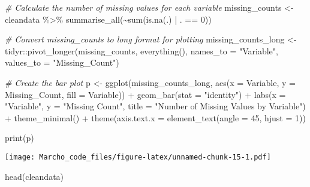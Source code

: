 \documentclass[
]{article}
\newenvironment{Shaded}{\begin{snugshade}}{\end{snugshade}}
\newcommand{\AttributeTok}[1]{\textcolor[rgb]{0.77,0.63,0.00}{#1}}
\newcommand{\CommentTok}[1]{\textcolor[rgb]{0.56,0.35,0.01}{\textit{#1}}}
\newcommand{\DecValTok}[1]{\textcolor[rgb]{0.00,0.00,0.81}{#1}}
\newcommand{\FunctionTok}[1]{\textcolor[rgb]{0.00,0.00,0.00}{#1}}
\newcommand{\NormalTok}[1]{#1}
\newcommand{\OtherTok}[1]{\textcolor[rgb]{0.56,0.35,0.01}{#1}}
\newcommand{\SpecialCharTok}[1]{\textcolor[rgb]{0.00,0.00,0.00}{#1}}
\newcommand{\StringTok}[1]{\textcolor[rgb]{0.31,0.60,0.02}{#1}}
\begin{document}
\begin{Shaded}
\begin{Highlighting}[]
\CommentTok{\# Calculate the number of missing values for each variable}
\NormalTok{missing\_counts }\OtherTok{\textless{}{-}}\NormalTok{ cleandata }\SpecialCharTok{\%\textgreater{}\%}
  \FunctionTok{summarise\_all}\NormalTok{(}\SpecialCharTok{\textasciitilde{}}\FunctionTok{sum}\NormalTok{(}\FunctionTok{is.na}\NormalTok{(.) }\SpecialCharTok{|}\NormalTok{ . }\SpecialCharTok{==} \DecValTok{0}\NormalTok{))}

\CommentTok{\# Convert missing\_counts to long format for plotting}
\NormalTok{missing\_counts\_long }\OtherTok{\textless{}{-}}\NormalTok{ tidyr}\SpecialCharTok{::}\FunctionTok{pivot\_longer}\NormalTok{(missing\_counts, }\FunctionTok{everything}\NormalTok{(), }\AttributeTok{names\_to =} \StringTok{"Variable"}\NormalTok{, }\AttributeTok{values\_to =} \StringTok{"Missing\_Count"}\NormalTok{)}

\CommentTok{\# Create the bar plot}
\NormalTok{p }\OtherTok{\textless{}{-}} \FunctionTok{ggplot}\NormalTok{(missing\_counts\_long, }\FunctionTok{aes}\NormalTok{(}\AttributeTok{x =}\NormalTok{ Variable, }\AttributeTok{y =}\NormalTok{ Missing\_Count, }\AttributeTok{fill =}\NormalTok{ Variable)) }\SpecialCharTok{+}
  \FunctionTok{geom\_bar}\NormalTok{(}\AttributeTok{stat =} \StringTok{"identity"}\NormalTok{) }\SpecialCharTok{+}
  \FunctionTok{labs}\NormalTok{(}\AttributeTok{x =} \StringTok{"Variable"}\NormalTok{, }\AttributeTok{y =} \StringTok{"Missing Count"}\NormalTok{, }\AttributeTok{title =} \StringTok{"Number of Missing Values by Variable"}\NormalTok{) }\SpecialCharTok{+}
  \FunctionTok{theme\_minimal}\NormalTok{() }\SpecialCharTok{+}
  \FunctionTok{theme}\NormalTok{(}\AttributeTok{axis.text.x =} \FunctionTok{element\_text}\NormalTok{(}\AttributeTok{angle =} \DecValTok{45}\NormalTok{, }\AttributeTok{hjust =} \DecValTok{1}\NormalTok{))}

\FunctionTok{print}\NormalTok{(p)}
\end{Highlighting}
\end{Shaded}

\texttt{[image: Marcho\_code\_files/figure-latex/unnamed-chunk-15-1.pdf]}

\begin{Shaded}
\begin{Highlighting}[]
\FunctionTok{head}\NormalTok{(cleandata)}
\end{Highlighting}
\end{Shaded}
\end{document}

